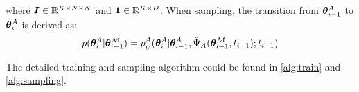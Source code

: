where $\boldsymbol{I}\in \mathbb{R}^{K\times N \times N}$ and $\boldsymbol{1}\in\mathbb{R}^{K\times D}$. When sampling, the transition from $\bm{\theta}^A_{i-1}$ to $\bm{\theta}^A_{i}$ is derived as:
\begin{equation}
    p(\bm{\theta}^A_{i}|\boldsymbol{\theta}_{i-1}^{\mathcal{M}})=p_{_U}^A(\bm{\theta}^A_{i}|\bm{\theta}^A_{i-1},\hat{\Psi}_A(\bm{\theta}^\mathcal{M}_{i-1}, t_{i-1});t_{i-1})
\end{equation}

The detailed training and sampling algorithm could be found in \cref{alg:train} and \cref{alg:sampling}.



